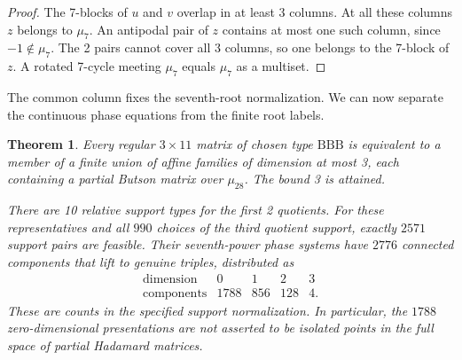 \documentclass[11pt,a4paper]{article}
\newtheorem{theorem}{Theorem}[section]
\theoremstyle{plain}
\theoremstyle{definition}
\theoremstyle{plain}
\begin{document}
\begin{proof}
The 7-blocks of $u$ and $v$ overlap in at least 3 columns. At all these columns $z$ belongs to $\mu_7$. An antipodal pair of $z$ contains at most one such column, since $-1\notin\mu_7$. The 2 pairs cannot cover all 3 columns, so one belongs to the 7-block of $z$. A rotated 7-cycle meeting $\mu_7$ equals $\mu_7$ as a multiset.
\end{proof}

\medskip
The common column fixes the seventh-root normalization. We can now separate the continuous phase equations from the finite root labels.

\par\addvspace{\medskipamount}\noindent
\begin{minipage}{\linewidth}
\begin{theorem}\label{n11_noA_BBB:main}
Every regular $3\times11$ matrix of chosen type $\mathrm{BBB}$ is equivalent to a member of a finite union of affine families of dimension at most 3, each containing a partial Butson matrix over $\mu_{28}$. The bound 3 is attained.

There are 10 relative support types for the first 2 quotients. For these representatives and all $990$ choices of the third quotient support, exactly $2571$ support pairs are feasible. Their seventh-power phase systems have $2776$ connected components that lift to genuine triples, distributed as
$$\begin{array}{c|rrrr}
\text{dimension}&0&1&2&3\\\hline
\text{components}&1788&856&128&4.
\end{array}$$
These are counts in the specified support normalization. In particular, the $1788$ zero-dimensional presentations are not asserted to be isolated points in the full space of partial Hadamard matrices.
\end{theorem}
\end{minipage}
\par\addvspace{\medskipamount}
\end{document}
